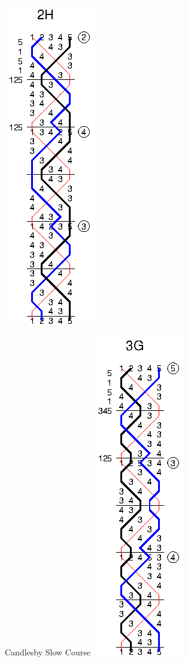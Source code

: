 \begin{figure}[t]
\begin{minipage}[t]{0.24\textwidth}
    \includegraphics{figs/methods/single-hunt/2H}
  \end{minipage}
  \begin{minipage}[t]{0.24\textwidth}
    \centering
    Candlesby Slow Course
    \includegraphics{figs/methods/single-hunt/3G}

\end{minipage}
\end{figure}
